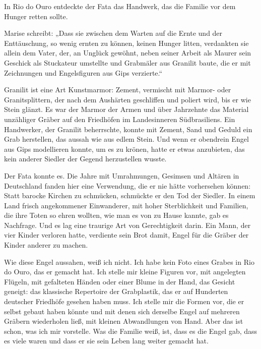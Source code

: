 \documentclass[
  ngerman,
  11pt,
  openany]{book}
\begin{document}
In Rio do Ouro entdeckte der Fata das Handwerk, das die Familie vor dem
Hunger retten sollte.

Marise schreibt: „Dass sie zwischen dem Warten auf die Ernte und der
Enttäuschung, so wenig ernten zu können, keinen Hunger litten,
verdankten sie allein dem Vater, der, an Unglück gewöhnt, neben seiner
Arbeit als Maurer sein Geschick als Stuckateur umstellte und Grabmäler
aus Granilit baute, die er mit Zeichnungen und Engelsfiguren aus Gips
verzierte.``

Granilit ist eine Art Kunstmarmor: Zement, vermischt mit Marmor- oder
Granitsplittern, der nach dem Aushärten geschliffen und poliert wird,
bis er wie Stein glänzt. Es war der Marmor der Armen und über Jahrzehnte
das Material unzähliger Gräber auf den Friedhöfen im Landesinneren
Südbrasiliens. Ein Handwerker, der Granilit beherrschte, konnte mit
Zement, Sand und Geduld ein Grab herstellen, das aussah wie aus edlem
Stein. Und wenn er obendrein Engel aus Gips modellieren konnte, um es zu
krönen, hatte er etwas anzubieten, das kein anderer Siedler der Gegend
herzustellen wusste.

Der Fata konnte es. Die Jahre mit Umrahmungen, Gesimsen und Altären in
Deutschland fanden hier eine Verwendung, die er nie hätte vorhersehen
können: Statt barocke Kirchen zu schmücken, schmückte er den Tod der
Siedler. In einem Land frisch angekommener Einwanderer, mit hoher
Sterblichkeit und Familien, die ihre Toten so ehren wollten, wie man es
von zu Hause kannte, gab es Nachfrage. Und es lag eine traurige Art von
Gerechtigkeit darin. Ein Mann, der vier Kinder verloren hatte, verdiente
sein Brot damit, Engel für die Gräber der Kinder anderer zu machen.

Wie diese Engel aussahen, weiß ich nicht. Ich habe kein Foto eines
Grabes in Rio do Ouro, das er gemacht hat. Ich stelle mir kleine Figuren
vor, mit angelegten Flügeln, mit gefalteten Händen oder einer Blume in
der Hand, das Gesicht geneigt: das klassische Repertoire der
Grabplastik, das er auf Hunderten deutscher Friedhöfe gesehen haben
muss. Ich stelle mir die Formen vor, die er selbst gebaut haben könnte
und mit denen sich derselbe Engel auf mehreren Gräbern wiederholen ließ,
mit kleinen Abwandlungen von Hand. Aber das ist schon, was ich mir
vorstelle. Was die Familie weiß, ist, dass es die Engel gab, dass es
viele waren und dass er sie sein Leben lang weiter gemacht hat.
\end{document}
